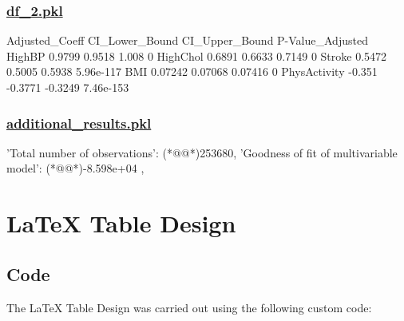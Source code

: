 \documentclass[11pt]{article}
\begin{document}
\subsubsection*{\hyperlink{code-Data Analysis-df-2-pkl}{df\_2.pkl}}

\begin{codeoutput}
             Adjusted\_Coeff CI\_Lower\_Bound CI\_Upper\_Bound P-Value\_Adjusted
HighBP               0.9799         0.9518          1.008                0
HighChol             0.6891         0.6633         0.7149                0
Stroke               0.5472         0.5005         0.5938        5.96e-117
BMI                 0.07242        0.07068        0.07416                0
PhysActivity         -0.351        -0.3771        -0.3249        7.46e-153
\end{codeoutput}\hypertarget{file-additional-results-pkl}{}

\subsubsection*{\hyperlink{code-Data Analysis-additional-results-pkl}{additional\_results.pkl}}

\begin{codeoutput}
{
    'Total number of observations': (*@@*)253680,
    'Goodness of fit of multivariable model': (*@@*)-8.598e+04        ,
}
\end{codeoutput}

\section{LaTeX Table Design}
\subsection{{Code}}
The LaTeX Table Design was carried out using the following custom code:
\end{document}
